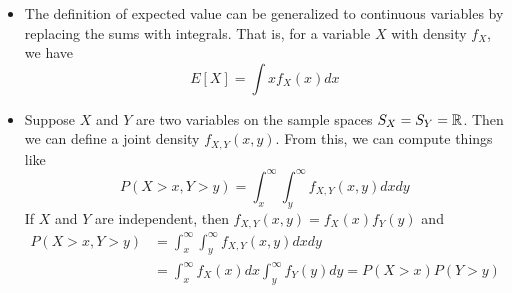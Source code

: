 \begin{itemize}
 \item The definition of expected value can be generalized to continuous variables by replacing the sums with integrals. That is, for a variable $X$ with density $f_X$, we have 
 \begin{equation*}
 E[X] = \int x f_X(x)dx 
 \end{equation*}
 \item Suppose $X$ and $Y$ are two variables on the sample spaces $S_X = S_Y = \mathbb R$. Then we can define a joint density $f_{X,Y}(x,y)$. From this, we can compute things like 
 \begin{equation*}
P(X>x,Y>y) = \int_{x}^{\infty}\int_y^{\infty}f_{X,Y}(x,y)dxdy
 \end{equation*}
 If $X$ and $Y$ are independent, then $f_{X,Y}(x,y) = f_X(x)f_Y(y)$ and 
 \begin{align*}
P(X>x,Y>y) &= \int_{x}^{\infty}\int_y^{\infty}f_{X,Y}(x,y) dx dy\\
&=  \int_{x}^{\infty}f_X(x)dx\int_y^{\infty}f_Y(y)dy
 =P(X>x)P(Y>y)
 \end{align*}
 \end{itemize}
  
  
